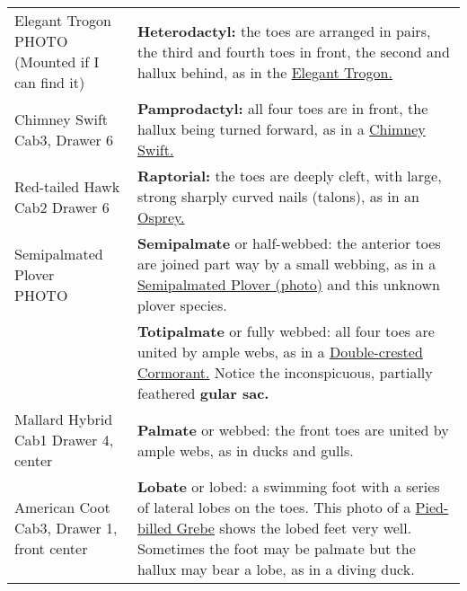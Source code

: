 \documentclass[10pt]{article}
\newif\ifprintkey
\newcommand{\PrintKey}[1]{\ifprintkey{\textbf{#1}}\fi}
\begin{document}
\begin{longtable}{@{}C{0.45\textwidth}L{0.45\textwidth}@{}}
%
\PrintKey{Elegant Trogon \newline PHOTO (Mounted if I can find it)}& \textbf{Heterodactyl:} the toes are arranged in pairs, the third and fourth toes in front, the second and hallux behind, as in the \href{https://www.allaboutbirds.org/guide/Elegant_Trogon}{Elegant Trogon.} \\ [2.5cm]
%
\PrintKey{Chimney Swift \newline Cab3, Drawer 6}& \textbf{Pamprodactyl:} all four toes are in front, the hallux being turned forward, as in a \href{https://www.allaboutbirds.org/guide/Chimney_Swift}{Chimney Swift.}\\ [2.5cm]
%
\PrintKey{Red-tailed Hawk \newline Cab2 Drawer 6}& \textbf{Raptorial:} the toes are deeply cleft, with large, strong sharply curved nails (talons), as in an \href{https://www.allaboutbirds.org/guide/Osprey}{Osprey.} \\ [2.5cm]
%
\PrintKey{Semipalmated Plover \newline PHOTO}& \textbf{Semipalmate} or half-webbed: the anterior toes are joined part way by a small webbing, as in a \href{https://www.allaboutbirds.org/guide/Semipalmated_Plover}{Semipalmated Plover (photo)} and this unknown plover species. \\ [2.5cm]
%
\PrintKey{Double-crested Cormorant}& \textbf{Totipalmate} or fully webbed: all four toes are united by ample webs, as in a \href{https://www.allaboutbirds.org/guide/Double-crested_Cormorant}{Double-crested Cormorant.} Notice the inconspicuous, partially feathered \textbf{gular sac.} \\ [2.5cm]
%
\PrintKey{Mallard Hybrid \newline Cab1 Drawer 4, center}& \textbf{Palmate} or webbed: the front toes are united by ample webs, as in ducks and gulls. \\ [2.5cm]
%
\PrintKey{American Coot \newline Cab3, Drawer 1, front center} & \textbf{Lobate} or lobed: a swimming foot with a series of lateral lobes on the toes. This photo of a \href{https://www.allaboutbirds.org/guide/Pied-billed_Grebe/media-browser/63919971}{Pied-billed Grebe} shows the lobed feet very well. Sometimes the foot may be palmate but the hallux may bear a lobe, as in a diving duck. \\ [2.5cm]
%

\bottomrule
\end{longtable}
\end{document}
